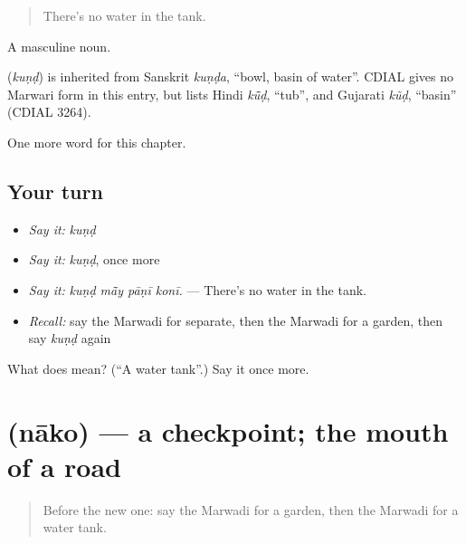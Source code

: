 \begin{quote}
There's no water in the tank.
\end{quote}

A masculine noun.

\begin{cousinweb}
\textbf{} (\emph{kuṇḍ}) is inherited from Sanskrit \emph{kuṇḍa}, \textquotedblleft{}bowl, basin of water\textquotedblright{}. CDIAL gives no Marwari form in this entry, but lists Hindi \emph{kū̃ḍ}, \textquotedblleft{}tub\textquotedblright{}, and Gujarati \emph{kũḍ}, \textquotedblleft{}basin\textquotedblright{} (CDIAL 3264).
\end{cousinweb}

\begin{grammarlens}[title={What you've built}]
One more word for this chapter.
\end{grammarlens}

\subsection*{Your turn}
\begin{itemize}
\raggedright
  \item \emph{Say it:} \emph{kuṇḍ}
  \item \emph{Say it:} \emph{kuṇḍ}, once more
  \item \emph{Say it:} \emph{kuṇḍ mā̃y pāṇī konī.} — There's no water in the tank.
  \item \emph{Recall:} say the Marwadi for separate, then the Marwadi for a garden, then say \emph{kuṇḍ} again
\end{itemize}

\begin{tcolorbox}[breakable,colback=teal!4,colframe=teal!35!black,title={Before you move on}]
What does  mean? (\textquotedblleft{}A water tank\textquotedblright{}.) Say it once more.
\end{tcolorbox}
\section[\texorpdfstring{\mw{नाको} (nāko)}{नाको (nāko)}]{ (nāko) — a checkpoint; the mouth of a road}

\label{lesson:MW-C207-nako}



\begin{quote}
Before the new one: say the Marwadi for a garden, then the Marwadi for a water tank.
\end{quote}

